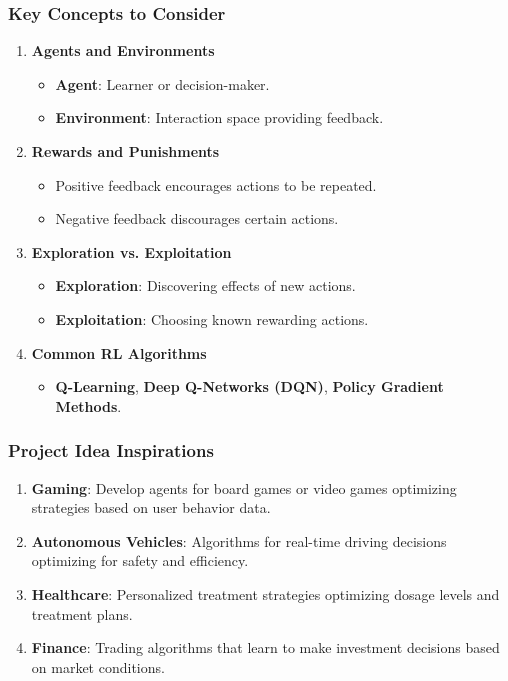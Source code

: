 \documentclass[aspectratio=169]{beamer}
\begin{document}
\begin{frame}[fragile]
    \frametitle{Key Concepts to Consider}
    \begin{enumerate}
        \item \textbf{Agents and Environments}
            \begin{itemize}
                \item \textbf{Agent}: Learner or decision-maker.
                \item \textbf{Environment}: Interaction space providing feedback.
            \end{itemize}
        \item \textbf{Rewards and Punishments}
            \begin{itemize}
                \item Positive feedback encourages actions to be repeated.
                \item Negative feedback discourages certain actions.
            \end{itemize}
        \item \textbf{Exploration vs. Exploitation}
            \begin{itemize}
                \item \textbf{Exploration}: Discovering effects of new actions.
                \item \textbf{Exploitation}: Choosing known rewarding actions.
            \end{itemize}
        \item \textbf{Common RL Algorithms}
            \begin{itemize}
                \item \textbf{Q-Learning}, \textbf{Deep Q-Networks (DQN)}, \textbf{Policy Gradient Methods}.
            \end{itemize}
    \end{enumerate}
\end{frame}

\begin{frame}[fragile]
    \frametitle{Project Idea Inspirations}
    \begin{enumerate}
        \item \textbf{Gaming}: Develop agents for board games or video games optimizing strategies based on user behavior data.
        \item \textbf{Autonomous Vehicles}: Algorithms for real-time driving decisions optimizing for safety and efficiency.
        \item \textbf{Healthcare}: Personalized treatment strategies optimizing dosage levels and treatment plans.
        \item \textbf{Finance}: Trading algorithms that learn to make investment decisions based on market conditions.
    \end{enumerate}
\end{frame}
\end{document}
